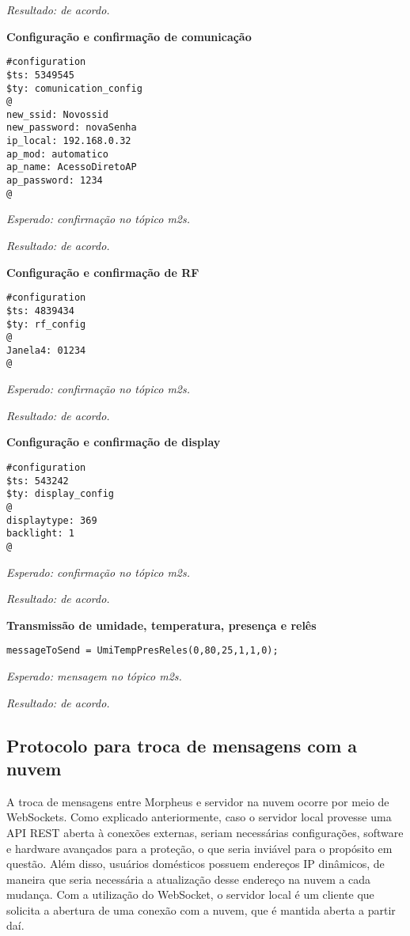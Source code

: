 \emph{Resultado: de acordo.}

\textbf{Configuração e confirmação de comunicação}
\begin{lstlisting}
#configuration
$ts: 5349545
$ty: comunication_config
@
new_ssid: Novossid
new_password: novaSenha
ip_local: 192.168.0.32
ap_mod: automatico
ap_name: AcessoDiretoAP
ap_password: 1234
@
\end{lstlisting}

\emph{Esperado: confirmação no tópico \wmqtt{} m2s.}

\emph{Resultado: de acordo.}

\textbf{Configuração e confirmação de RF}
\begin{lstlisting}
#configuration
$ts: 4839434
$ty: rf_config
@
Janela4: 01234
@
\end{lstlisting}

\emph{Esperado: confirmação no tópico \wmqtt{} m2s.}

\emph{Resultado: de acordo.}

\textbf{Configuração e confirmação de display}
\begin{lstlisting}
#configuration
$ts: 543242
$ty: display_config
@
displaytype: 369
backlight: 1
@
\end{lstlisting}

\emph{Esperado: confirmação no tópico \wmqtt{} m2s.}

\emph{Resultado: de acordo.}

\textbf{Transmissão de umidade, temperatura, presença e relês}
\begin{lstlisting}
messageToSend = UmiTempPresReles(0,80,25,1,1,0);
\end{lstlisting}

\emph{Esperado: mensagem no tópico \wmqtt{} m2s.}

\emph{Resultado: de acordo.}

\subsection{Protocolo para troca de mensagens com a nuvem}
A troca de mensagens entre Morpheus e servidor na nuvem ocorre por meio de WebSockets. Como explicado anteriormente, caso o servidor local provesse uma API REST aberta à conexões externas, seriam necessárias configurações, software e hardware avançados para a proteção, o que seria inviável para o propósito em questão. Além disso, usuários domésticos possuem endereços IP dinâmicos, de maneira que seria necessária a atualização desse endereço na nuvem a cada mudança. Com a utilização do WebSocket, o servidor local é um cliente que solicita a abertura de uma conexão com a nuvem, que é mantida aberta a partir daí.

